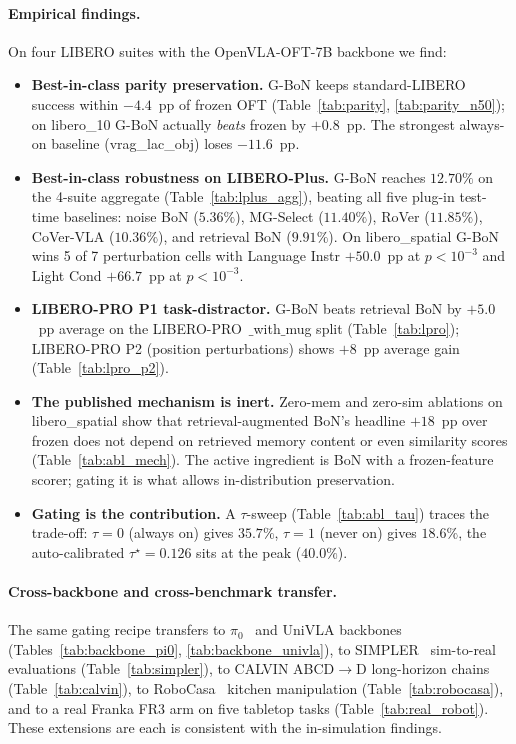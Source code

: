 \documentclass{article}
\begin{document}
\paragraph{Empirical findings.}
On four LIBERO suites with the OpenVLA-OFT-7B backbone we find:
\begin{itemize}[topsep=0pt,itemsep=2pt,leftmargin=*]
\item \textbf{Best-in-class parity preservation.} G-BoN keeps
      standard-LIBERO success within $-4.4$~pp of frozen OFT
      (Table~\ref{tab:parity}, \ref{tab:parity_n50}); on libero\_10
      G-BoN actually \emph{beats} frozen by $+0.8$~pp. The strongest
      always-on baseline (vrag\_lac\_obj) loses $-11.6$~pp.
\item \textbf{Best-in-class robustness on LIBERO-Plus.} G-BoN reaches
      $12.70\%$ on the 4-suite aggregate (Table~\ref{tab:lplus_agg}),
      beating all five plug-in test-time baselines: noise BoN ($5.36\%$),
      MG-Select ($11.40\%$), RoVer ($11.85\%$),
      CoVer-VLA ($10.36\%$), and retrieval BoN ($9.91\%$). On
      libero\_spatial G-BoN wins 5 of 7 perturbation cells with
      Language Instr $+50.0$~pp at $p < 10^{-3}$ and Light Cond
      $+66.7$~pp at $p < 10^{-3}$.
\item \textbf{LIBERO-PRO P1 task-distractor.} G-BoN beats
      retrieval BoN by $+5.0$~pp average on the LIBERO-PRO~$\_$with$\_$mug
      split (Table~\ref{tab:lpro}); LIBERO-PRO P2 (position
      perturbations) shows $+8$~pp average gain
      (Table~\ref{tab:lpro_p2}).
\item \textbf{The published mechanism is inert.} Zero-mem and zero-sim
      ablations on libero\_spatial show that retrieval-augmented BoN's
      headline $+18$~pp over frozen does not depend on retrieved memory
      content or even similarity scores (Table~\ref{tab:abl_mech}).
      The active ingredient is BoN with a frozen-feature scorer; gating
      it is what allows in-distribution preservation.
\item \textbf{Gating is the contribution.} A $\tau$-sweep
      (Table~\ref{tab:abl_tau}) traces the trade-off:
      $\tau{=}0$ (always on) gives $35.7\%$, $\tau{=}1$ (never on)
      gives $18.6\%$, the auto-calibrated $\tau^\star{=}0.126$ sits
      at the peak ($40.0\%$).
\end{itemize}

\paragraph{Cross-backbone and cross-benchmark transfer.}
The same gating recipe transfers to $\pi_0$~\citep{pi02024} and UniVLA
backbones (Tables~\ref{tab:backbone_pi0}, \ref{tab:backbone_univla}),
to SIMPLER~\citep{simpler2024} sim-to-real evaluations
(Table~\ref{tab:simpler}), to CALVIN ABCD$\to$D long-horizon chains
(Table~\ref{tab:calvin}), to RoboCasa~\citep{robocasa2024} kitchen
manipulation (Table~\ref{tab:robocasa}), and to a real Franka FR3
arm on five tabletop tasks (Table~\ref{tab:real_robot}). These
extensions are
each is consistent with the in-simulation findings.
\end{document}
